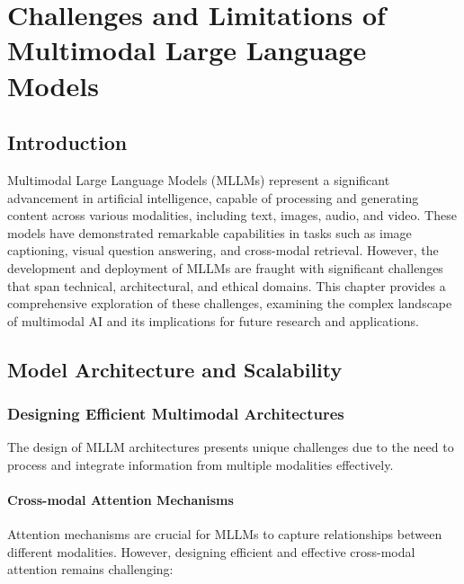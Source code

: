 \chapter{Challenges and Limitations of Multimodal Large Language Models}

\section{Introduction}
Multimodal Large Language Models (MLLMs) represent a significant advancement in artificial intelligence, capable of processing and generating content across various modalities, including text, images, audio, and video. These models have demonstrated remarkable capabilities in tasks such as image captioning, visual question answering, and cross-modal retrieval. However, the development and deployment of MLLMs are fraught with significant challenges that span technical, architectural, and ethical domains. This chapter provides a comprehensive exploration of these challenges, examining the complex landscape of multimodal AI and its implications for future research and applications.

\section{Model Architecture and Scalability}

\subsection{Designing Efficient Multimodal Architectures}
The design of MLLM architectures presents unique challenges due to the need to process and integrate information from multiple modalities effectively.

\subsubsection{Cross-modal Attention Mechanisms}
Attention mechanisms are crucial for MLLMs to capture relationships between different modalities. However, designing efficient and effective cross-modal attention remains challenging:

